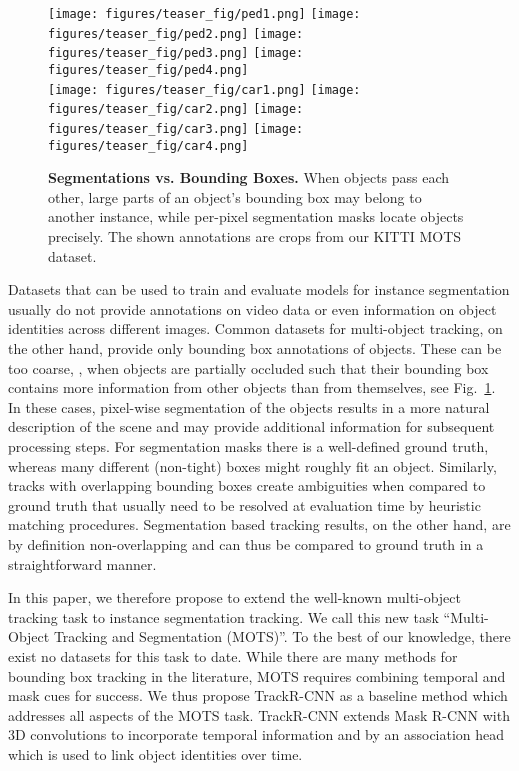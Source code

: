 \documentclass[10pt,twocolumn,letterpaper]{article}
\begin{document}
\begin{figure}[t!]
	\centering
		\hspace{-5pt}
		\texttt{[image: figures/teaser\_fig/ped1.png]}
		\texttt{[image: figures/teaser\_fig/ped2.png]}
		\vspace{1.2pt}
		\texttt{[image: figures/teaser\_fig/ped3.png]}
		\texttt{[image: figures/teaser\_fig/ped4.png]}
		\\
		
		\texttt{[image: figures/teaser\_fig/car1.png]}
		\texttt{[image: figures/teaser\_fig/car2.png]}
		\texttt{[image: figures/teaser\_fig/car3.png]}
		\texttt{[image: figures/teaser\_fig/car4.png]}
\vspace{-6pt}\caption{\textbf{Segmentations vs. Bounding Boxes.} When objects pass each other, large parts of an object's bounding box may belong to another instance, while per-pixel segmentation masks locate objects precisely. The shown annotations are crops from our KITTI MOTS dataset.
	}
	\label{fig:people-overlap}
\end{figure}

Datasets that can be used to train and evaluate models for instance segmentation usually do not provide annotations on video data or even information on object identities across different images. Common datasets for multi-object tracking, on the other hand, provide only bounding box annotations of objects. These can be too coarse, \eg, when objects are partially occluded such that their bounding box contains more information from other objects than from themselves, see Fig.~\ref{fig:people-overlap}. In these cases, pixel-wise segmentation of the objects results in a more natural description of the scene and may provide additional information for subsequent processing steps. For segmentation masks there is a well-defined ground truth, whereas many different (non-tight) boxes might roughly fit an object. Similarly, tracks with overlapping bounding boxes create ambiguities when compared to ground truth that usually need to be resolved at evaluation time by heuristic matching procedures. Segmentation based tracking results, on the other hand, are by definition non-overlapping and can thus be compared to ground truth in a straightforward manner.

In this paper, we therefore propose to extend the well-known multi-object tracking task to instance segmentation tracking. We call this new task ``Multi-Object Tracking and Segmentation (MOTS)''. To the best of our knowledge, there exist no datasets for this task to date.
While there are many methods for bounding box tracking in the literature, MOTS requires combining temporal and mask cues for success.
We thus propose TrackR-CNN as a baseline method which addresses all aspects of the MOTS task. TrackR-CNN extends Mask R-CNN \cite{He17ICCV} with 3D convolutions to incorporate temporal information and by an association head which is used to link object identities over time.
\end{document}
